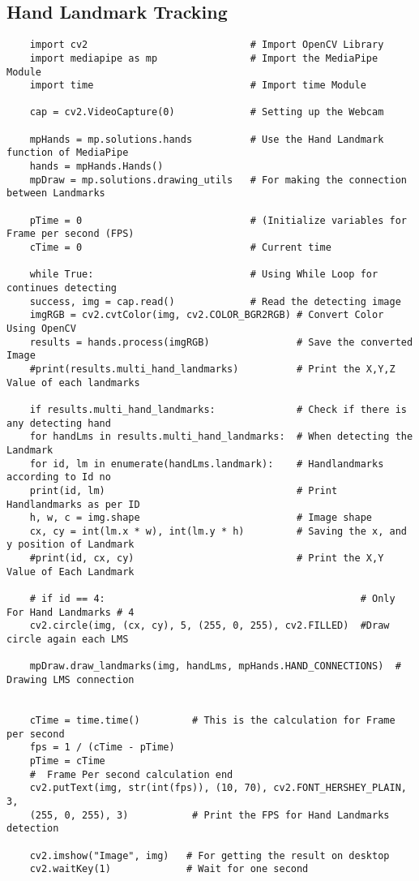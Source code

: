 \subsection{Hand Landmark Tracking}
\begin{verbatim}
	import cv2                            # Import OpenCV Library
	import mediapipe as mp                # Import the MediaPipe Module
	import time                           # Import time Module
	
	cap = cv2.VideoCapture(0)             # Setting up the Webcam
	
	mpHands = mp.solutions.hands          # Use the Hand Landmark function of MediaPipe
	hands = mpHands.Hands()
	mpDraw = mp.solutions.drawing_utils   # For making the connection between Landmarks
	
	pTime = 0                             # (Initialize variables for Frame per second (FPS)
	cTime = 0                             # Current time
	
	while True:                           # Using While Loop for continues detecting 
	success, img = cap.read()             # Read the detecting image
	imgRGB = cv2.cvtColor(img, cv2.COLOR_BGR2RGB) # Convert Color Using OpenCV
	results = hands.process(imgRGB)               # Save the converted Image
	#print(results.multi_hand_landmarks)          # Print the X,Y,Z Value of each landmarks
	
	if results.multi_hand_landmarks:              # Check if there is any detecting hand
	for handLms in results.multi_hand_landmarks:  # When detecting the Landmark
	for id, lm in enumerate(handLms.landmark):    # Handlandmarks according to Id no
	print(id, lm)                                 # Print Handlandmarks as per ID
	h, w, c = img.shape                           # Image shape
	cx, cy = int(lm.x * w), int(lm.y * h)         # Saving the x, and y position of Landmark
	#print(id, cx, cy)                            # Print the X,Y Value of Each Landmark
	
	# if id == 4:                                            # Only For Hand Landmarks # 4 
	cv2.circle(img, (cx, cy), 5, (255, 0, 255), cv2.FILLED)  #Draw circle again each LMS 
	
	mpDraw.draw_landmarks(img, handLms, mpHands.HAND_CONNECTIONS)  # Drawing LMS connection
	
	
	cTime = time.time()         # This is the calculation for Frame per second
	fps = 1 / (cTime - pTime)
	pTime = cTime
	#  Frame Per second calculation end
	cv2.putText(img, str(int(fps)), (10, 70), cv2.FONT_HERSHEY_PLAIN, 3,
	(255, 0, 255), 3)           # Print the FPS for Hand Landmarks detection
	
	cv2.imshow("Image", img)   # For getting the result on desktop
	cv2.waitKey(1)             # Wait for one second
\end{verbatim}


